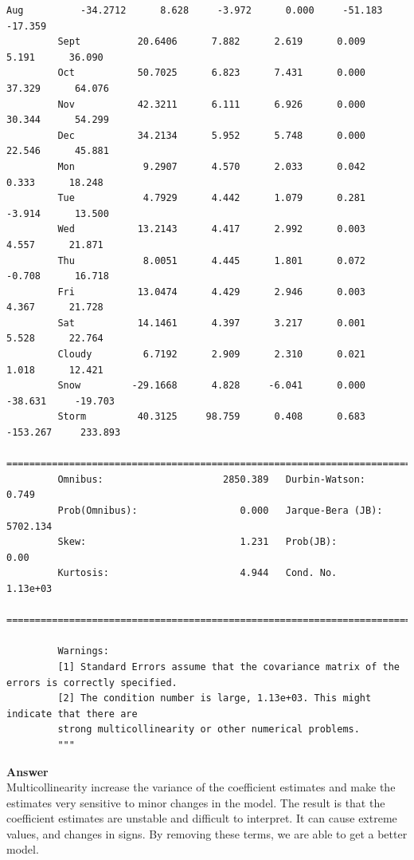 \documentclass[11pt]{article}
\begin{document}
\begin{Verbatim}[commandchars=\\\{\}]
         Aug          -34.2712      8.628     -3.972      0.000     -51.183     -17.359
         Sept          20.6406      7.882      2.619      0.009       5.191      36.090
         Oct           50.7025      6.823      7.431      0.000      37.329      64.076
         Nov           42.3211      6.111      6.926      0.000      30.344      54.299
         Dec           34.2134      5.952      5.748      0.000      22.546      45.881
         Mon            9.2907      4.570      2.033      0.042       0.333      18.248
         Tue            4.7929      4.442      1.079      0.281      -3.914      13.500
         Wed           13.2143      4.417      2.992      0.003       4.557      21.871
         Thu            8.0051      4.445      1.801      0.072      -0.708      16.718
         Fri           13.0474      4.429      2.946      0.003       4.367      21.728
         Sat           14.1461      4.397      3.217      0.001       5.528      22.764
         Cloudy         6.7192      2.909      2.310      0.021       1.018      12.421
         Snow         -29.1668      4.828     -6.041      0.000     -38.631     -19.703
         Storm         40.3125     98.759      0.408      0.683    -153.267     233.893
         ==============================================================================
         Omnibus:                     2850.389   Durbin-Watson:                   0.749
         Prob(Omnibus):                  0.000   Jarque-Bera (JB):             5702.134
         Skew:                           1.231   Prob(JB):                         0.00
         Kurtosis:                       4.944   Cond. No.                     1.13e+03
         ==============================================================================
         
         Warnings:
         [1] Standard Errors assume that the covariance matrix of the errors is correctly specified.
         [2] The condition number is large, 1.13e+03. This might indicate that there are
         strong multicollinearity or other numerical problems.
         """
\end{Verbatim}
            
    \textbf{Answer}\\
Multicollinearity increase the variance of the coefficient estimates and
make the estimates very sensitive to minor changes in the model. The
result is that the coefficient estimates are unstable and difficult to
interpret. It can cause extreme values, and changes in signs. By
removing these terms, we are able to get a better model.
\end{document}
